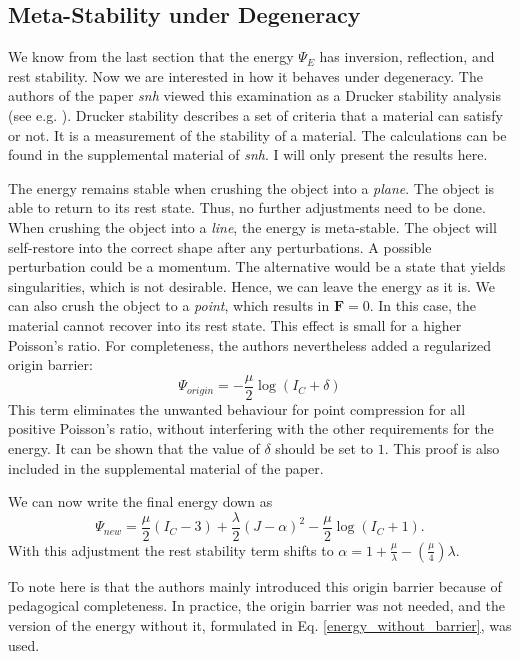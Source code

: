 {{{\subsection{Meta-Stability under Degeneracy}
We know from the last section that the energy $\Psi_{E}$ has inversion, reflection, and rest stability. Now we are interested in how it behaves under degeneracy. The authors of the paper \textit{\acrshort{snh}} viewed this examination as a Drucker stability analysis (see e.g. \cite{bower2009applied}). Drucker stability describes a set of criteria that a material can satisfy or not. It is a measurement of the stability of a material. The calculations can be found in the supplemental material of \textit{\acrshort{snh}}. I will only present the results here. 

The energy remains stable when crushing the object into a \textit{plane}. The object is able to return to its rest state. Thus, no further adjustments need to be done. When crushing the object into a \textit{line}, the energy is meta-stable. The object will self-restore into the correct shape after any perturbations. A possible perturbation could be a momentum. The alternative would be a state that yields singularities, which is not desirable. Hence, we can leave the energy as it is. We can also crush the object to a \textit{point}, which results in $\mathbf{F} = 0$. In this case, the material cannot recover into its rest state. This effect is small for a higher Poisson's ratio. For completeness, the authors nevertheless added a regularized origin barrier:
\[
	\Psi_{origin} = - \frac{\mu}{2}\operatorname{log}(I_C +\delta)
\]
This term eliminates the unwanted behaviour for point compression for all positive Poisson's ratio, without interfering with the other requirements for the energy. It can be shown that the value of $\delta$ should be set to $1$. This proof is also included in the supplemental material of the paper.

We can now write the final energy down as
\begin{equation}\label{eq:stable_energy}
\boxed{\Psi_{new} = \frac{\mu}{2}\left(I_{C}-3\right) + \frac{\lambda}{2}(J-\alpha)^{2} - \frac{\mu}{2} \operatorname{log}\left(I_{C}+1\right).}
\end{equation}
With this adjustment the rest stability term shifts to $\alpha=1+\frac{\mu}{\lambda}-\left(\frac{\mu}{4}\right)\lambda$.

To note here is that the authors mainly introduced this origin barrier because of pedagogical completeness. In practice, the origin barrier was not needed, and the version of the energy without it, formulated in Eq. \eqref{energy_without_barrier}, was used.

}}}
